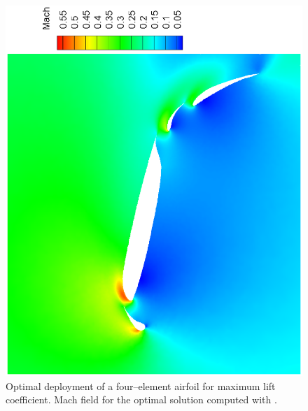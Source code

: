 \documentclass{vki_ls}
\begin{document}
\begin{figure}[ht!]
    \centering
    \includegraphics[angle=-90,scale=0.5]{maeas/4elemRes.eps}
    \caption{Optimal deployment of a four--element airfoil for maximum lift 
	coefficient. Mach field for the optimal solution computed with 
	\MAEA.}
    \label{f:elemRes}
\end{figure}
%
\end{document}
